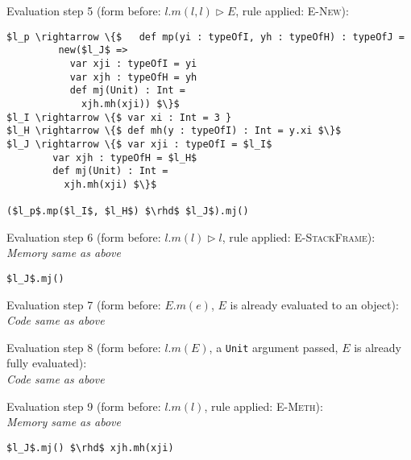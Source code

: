 \documentclass{llncs}
\begin{document}
\vspace{12pt}
\noindent Evaluation step 5 (form before: $l.m(l, l) \rhd E$, rule applied: \textsc{E-New}):
\vspace{-6pt}
\begin{lstlisting}[xleftmargin=20pt]
$l_p \rightarrow \{$   def mp(yi : typeOfI, yh : typeOfH) : typeOfJ =
         new($l_J$ =>
           var xji : typeOfI = yi
           var xjh : typeOfH = yh
           def mj(Unit) : Int =
             xjh.mh(xji)) $\}$
$l_I \rightarrow \{$ var xi : Int = 3 }
$l_H \rightarrow \{$ def mh(y : typeOfI) : Int = y.xi $\}$
$l_J \rightarrow \{$ var xji : typeOfI = $l_I$
        var xjh : typeOfH = $l_H$
        def mj(Unit) : Int =
          xjh.mh(xji) $\}$

($l_p$.mp($l_I$, $l_H$) $\rhd$ $l_J$).mj()
\end{lstlisting}

\vspace{12pt}
\noindent Evaluation step 6 (form before: $l.m(l) \rhd l$, rule applied: \textsc{E-StackFrame}):\\
\vspace{-6pt}
\indent\textit{Memory same as above}\\
\vspace{-6pt}
\begin{lstlisting}[xleftmargin=20pt]
$l_J$.mj()
\end{lstlisting}

\vspace{12pt}
\noindent Evaluation step 7 (form before: $E.m(e)$, $E$ is already evaluated to an object):\\
\indent\textit{Code same as above}

\vspace{12pt}
\noindent Evaluation step 8 (form before: $l.m(E)$, a \lstinline{Unit} argument passed, $E$ is already fully evaluated):\\
\indent\textit{Code same as above}

\vspace{12pt}
\noindent Evaluation step 9 (form before: $l.m(l)$, rule applied: \textsc{E-Meth}):\\
\vspace{-6pt}
\indent\textit{Memory same as above}\\
\vspace{-6pt}
\begin{lstlisting}[xleftmargin=20pt]
$l_J$.mj() $\rhd$ xjh.mh(xji)
\end{lstlisting}
\end{document}
